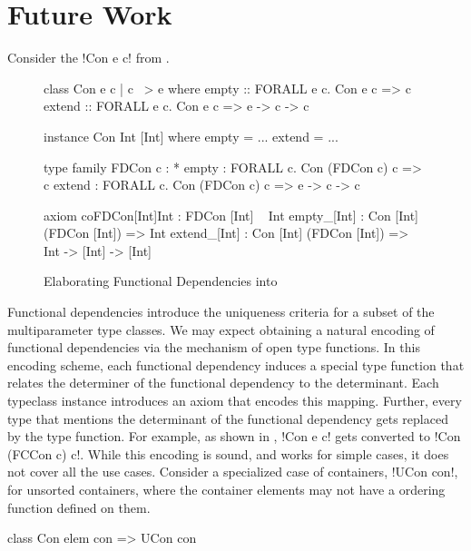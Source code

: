 \documentclass[screen,nonacm,manuscript,review]{acmart} %
\begin{document}
\section{Future Work}\label{sec:future-work}
Consider the !Con e c! from .
\begin{figure}[ht]
\begin{minipage}{0.5\linewidth}
\begin{code}
class Con e c | c ~> e where
  empty :: FORALL e c. Con e c => c
  extend :: FORALL e c. Con e c => e -> c -> c

instance Con Int [Int] where
  empty = ...
  extend = ...
\end{code}
\end{minipage}%
\begin{minipage}{0.5\linewidth}
\begin{code}
type family FDCon c : *
empty : FORALL c. Con (FDCon c) c => c
extend : FORALL c. Con (FDCon c) c => e -> c -> c

axiom coFDCon[Int]Int : FDCon [Int] ~ Int
empty_[Int]  : Con [Int] (FDCon [Int]) => Int
extend_[Int] : Con [Int] (FDCon [Int]) => Int -> [Int] -> [Int]

\end{code}
\end{minipage}
\caption[FunDeps in \SFC]{Elaborating Functional Dependencies into \SFC}
\label{fig:elab-fundeps-sfc}
\end{figure}
Functional dependencies introduce the
uniqueness criteria for a subset of the multiparameter type classes.
We may expect obtaining a natural encoding of functional dependencies
via the mechanism of open type functions. In this encoding scheme,
each functional dependency induces a special
type function that relates the determiner of the functional dependency
to the determinant. Each typeclass instance introduces an axiom that
encodes this mapping. Further, every type that mentions the
determinant of the functional dependency gets replaced by the type
function. For example, as shown in ,
!Con e c! gets converted to !Con (FCCon c) c!. While this encoding is
sound, and works for simple cases, it does not cover all the use cases.
Consider a specialized case of containers, !UCon con!, for unsorted containers,
where the container elements may not have a ordering function defined
on them.

\begin{CenteredBox}
\begin{code}
class Con elem con => UCon con
\end{code}
\end{CenteredBox}
\end{document}
